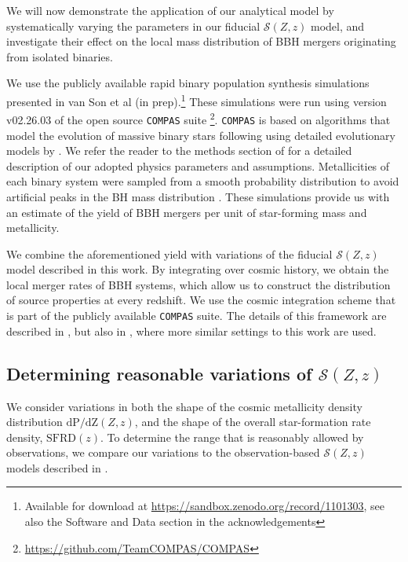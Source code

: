\documentclass[linenumbers,twocolumn]{aastex631}
\newcommand{\SFRDzZ}{\ensuremath{\mathcal{S}(Z,z)}\xspace}
\newcommand{\SFRDz}{\ensuremath{\mathrm{SFRD}(z)}\xspace}
\newcommand{\dpdZ}{\ensuremath{\mathrm{dP/dZ}(Z,z)}\xspace}
\newcommand{\COMPAS}{{\tt COMPAS}\xspace}
\begin{document}
We will now demonstrate the application of our analytical model by systematically varying the parameters in our fiducial \SFRDzZ model, and investigate their effect on the local mass distribution of BBH mergers originating from isolated binaries. 


We use the publicly available rapid binary population synthesis simulations presented in van Son et al (in prep).\footnote{Available for download at \url{https://sandbox.zenodo.org/record/1101303},  see also the Software and Data section in the acknowledgements}  
These simulations were run using version v02.26.03 of the open source \COMPAS suite \citep{COMPAS_method}\footnote{\url{https://github.com/TeamCOMPAS/COMPAS}}. \COMPAS is based on algorithms that model the evolution of massive binary stars following \citet{Hurley+2000, Hurley+2002} using detailed evolutionary models by \citet{Pols+1998}.  We refer the reader to the methods section of \cite{vanson+2022} for a detailed description of our adopted physics parameters and assumptions.
%
Metallicities of each binary system were sampled from a smooth probability distribution to avoid artificial peaks in the BH mass distribution \citep[e.g.][]{Dominik2015,Kummer_thesis}. 
These simulations provide us with an estimate of the yield of BBH mergers per unit of star-forming mass and metallicity. 

We combine the aforementioned yield with variations of the fiducial \SFRDzZ model described in this work. By integrating over cosmic history, we obtain the local merger rates of BBH systems, which allow us to construct the distribution of source properties at every redshift. We use the cosmic integration scheme that is part of the publicly available \COMPAS suite. The details of this framework are described in \cite{Neijssel+2019}, but also in \cite{vanson+2022}, where more similar settings to this work are used. 


\subsection{Determining reasonable variations of \SFRDzZ \label{ss: reasonable var}}
We consider variations in both the shape of the cosmic metallicity density distribution \dpdZ, and the shape of the overall star-formation rate density, \SFRDz. To determine the range that is reasonably allowed by observations, we compare our variations to the observation-based \SFRDzZ models described in \cite{Chruslinska+2021}.
\end{document}

